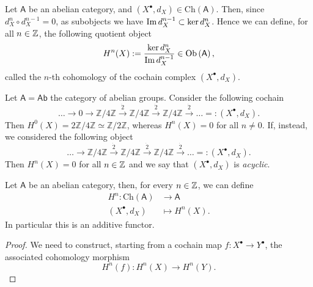 \begin{defn}[Cohomology]
	Let $\mathsf{A}$ be an abelian category,
	and $\left( X^{\bullet}, d_{X} \right) \in \mathrm{Ch}(\mathsf{A})$.
	Then,  since $d^n_X \circ d^{n-1}_X = 0$, 
	as subobjects we have $\operatorname{Im} d^{n-1}_X \subset \ker d_X^n$.
	Hence we can define, for all $n \in \mathbb{Z}$, the following quotient object
	\begin{equation}
		H^n(X) :=
		\frac{\ker d^n_X}{\operatorname{Im} d_X^{n-1}} \in \mathrm{Ob} \left(\mathsf{A}\right)
	,\end{equation} 
	called the $n$-th cohomology of the cochain complex $\left( X^{\bullet}, d_{X} \right)$.
\end{defn}

\begin{ex}
	Let $\mathsf{A} = \mathsf{Ab}$ the category of abelian groups.
	Consider the following cochain
	\begin{equation}
	\ldots \to 0 \to \mathbb{Z}/4\mathbb{Z} \xrightarrow{\dot{2}} \mathbb{Z}/4\mathbb{Z}
	\xrightarrow{\dot{2}} \mathbb{Z}/4\mathbb{Z} \xrightarrow{\dot{2}} \ldots
	=: \left( X^{\bullet}, d_{X} \right)	
	.\end{equation} 
	Then $H^0(X) = 2\mathbb{Z}/4\mathbb{Z} \simeq \mathbb{Z}/2\mathbb{Z}$, whereas
	$H^n(X) = 0$ for all $n \neq 0$.
	If, instead, we considered the following object
	\begin{equation}
	\ldots \to \mathbb{Z}/4\mathbb{Z} \xrightarrow{\dot{2}} \mathbb{Z}/4\mathbb{Z}
	\xrightarrow{\dot{2}} \mathbb{Z}/4\mathbb{Z} \xrightarrow{\dot{2}} \ldots
	=: \left( X^{\bullet}, d_{X} \right)	
	.\end{equation} 
	Then $H^n(X) = 0$ for all $n \in \mathbb{Z}$ and we say that 
	$\left( X^{\bullet}, d_{X} \right)$ is {\em acyclic}.
\end{ex}

\begin{prop}
	Let $\mathsf{A}$ be an abelian category, then, for every $n \in \mathbb{Z}$, we can define 
	\begin{align}
		H^n: \mathrm{Ch}(\mathsf{A}) &\to \mathsf{A} \\
		\left( X^{\bullet}, d_{X} \right) &\mapsto H^n(X)
	.\end{align}
	In particular this is an additive functor.
\end{prop} 
\begin{proof}
	We need to construct, starting from a cochain map $f: X^{\bullet} \to Y^{\bullet}$, the associated cohomology morphism
	\begin{equation}
		H^n(f): H^n(X) \to H^n(Y)
	.\end{equation} 
\end{proof}

